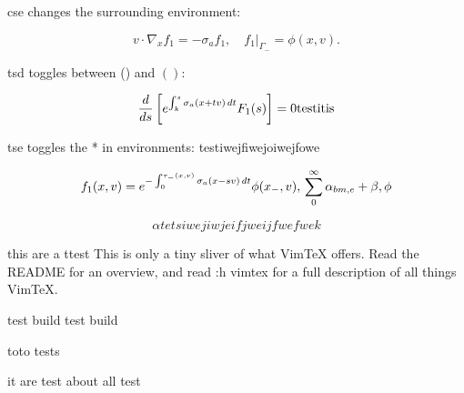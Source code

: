 \documentclass{article}
\begin{document}
cse changes the surrounding environment:

\begin{equation}
  v \cdot \nabla_x f_1 = -\sigma_a f_1, \quad f_1 \rvert_{\Gamma_-} = \phi(x,v).
\end{equation}

tsd toggles between () and \( \left( \right) \):

\begin{equation*}
  \frac{d}{ds} \left[ e^{\int_k^s \sigma_a(x + tv)\,dt} F_1(s) \right] = 0 \\
	\rm{test it is}
\end{equation*}

tse toggles the * in environments:
testiwejfiwejoiwejfowe

\begin{equation}
  f_1(x, v) = e^{-\int_0^{\tau_-(x, v)} \sigma_a(x - sv)\,dt} \phi(x_-, v),\\
	\sum_0^\infty {\alpha_{bm,e} + \beta, \phi}
\end{equation}

\begin{equation}
	\alpha tets
	iwejiwjeifjweijfwefwek
\end{equation}

this are a ttest
This is only a tiny sliver of what VimTeX offers.
Read the README for an overview, and read :h vimtex for a full description of
all things VimTeX.

test build
test build 

toto tests

it are test about
all
test
\end{document}
